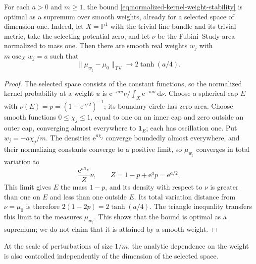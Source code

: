 \begin{example}\label{ex:sharp-kernel-weight-modulus}
For each $a>0$ and $m\geq1$, the bound \eqref{eq:normalized-kernel-weight-stability} is optimal as a supremum over smooth weights, already for a selected space of dimension one. Indeed, let $X=\mathbb P^1$ with the trivial line bundle and its trivial metric, take the selecting potential zero, and let $\nu$ be the Fubini--Study area normalized to mass one. Then there are smooth real weights $w_j$ with $m\operatorname{osc}_Xw_j=a$ such that
\[
 \|\mu_{w_j}-\mu_0\|_{\mathrm{TV}}\longrightarrow2\tanh(a/4).
\]
\end{example}
\begin{proof}
The selected space consists of the constant functions, so the normalized kernel probability at a weight $u$ is $\mathrm{e}^{-mu}\nu/\int_X\mathrm{e}^{-mu}\,\mathrm{d}\nu$. Choose a spherical cap $E$ with $\nu(E)=p=(1+\mathrm{e}^{a/2})^{-1}$; its boundary circle has zero area. Choose smooth functions $0\leq\chi_j\leq1$, equal to one on an inner cap and zero outside an outer cap, converging almost everywhere to $\mathbf1_E$; each has oscillation one. Put $w_j=-a\chi_j/m$. The densities $\mathrm{e}^{a\chi_j}$ converge boundedly almost everywhere, and their normalizing constants converge to a positive limit, so $\mu_{w_j}$ converges in total variation to
\[
 \frac{\mathrm{e}^{a\mathbf1_E}}{Z}\nu,
 \qquad Z=1-p+\mathrm{e}^ap=\mathrm{e}^{a/2}.
\]
This limit gives $E$ the mass $1-p$, and its density with respect to $\nu$ is greater than one on $E$ and less than one outside $E$. Its total variation distance from $\nu=\mu_0$ is therefore $2(1-2p)=2\tanh(a/4)$. The triangle inequality transfers this limit to the measures $\mu_{w_j}$. This shows that the bound is optimal as a supremum; we do not claim that it is attained by a smooth weight.
\end{proof}

At the scale of perturbations of size $1/m$, the analytic dependence on the weight is also controlled independently of the dimension of the selected space.

